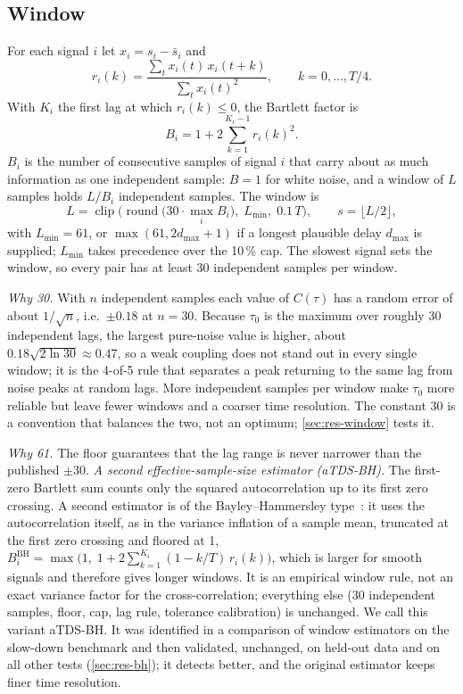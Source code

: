 \documentclass[11pt,a4paper]{article}
\begin{document}
\subsection{Window}
\label{sec:window}
For each signal $i$ let $x_i = s_i - \bar s_i$ and
\begin{equation}
r_i(k) = \frac{\sum_t x_i(t)\, x_i(t+k)}{\sum_t x_i(t)^2}, \qquad k = 0, \dots, T/4 .
\end{equation}
With $K_i$ the first lag at which $r_i(k) \le 0$, the Bartlett factor is
\begin{equation}
B_i = 1 + 2 \sum_{k=1}^{K_i - 1} r_i(k)^2 .
\label{eq:bartlett}
\end{equation}
$B_i$ is the number of consecutive samples of signal $i$ that carry about as much information as one independent sample: $B = 1$ for white noise, and a window of $L$ samples holds $L / B_i$ independent samples. The window is
\begin{equation}
L = \operatorname{clip}\!\Big(\operatorname{round}\big(30 \cdot \max_i B_i\big),\; L_{\min},\; 0.1\,T\Big), \qquad s = \lfloor L/2 \rfloor ,
\label{eq:window}
\end{equation}
with $L_{\min} = 61$, or $\max(61, 2 d_{\max} + 1)$ if a longest plausible delay $d_{\max}$ is supplied; $L_{\min}$ takes precedence over the 10\,\% cap. The slowest signal sets the window, so every pair has at least 30 independent samples per window.

\emph{Why 30.} With $n$ independent samples each value of $C(\tau)$ has a random error of about $1/\sqrt{n}$, i.e.\ $\pm0.18$ at $n = 30$. Because $\tau_0$ is the maximum over roughly 30 independent lags, the largest pure-noise value is higher, about $0.18\sqrt{2\ln 30} \approx 0.47$, so a weak coupling does not stand out in every single window; it is the 4-of-5 rule that separates a peak returning to the same lag from noise peaks at random lags. More independent samples per window make $\tau_0$ more reliable but leave fewer windows and a coarser time resolution. The constant 30 is a convention that balances the two, not an optimum; \cref{sec:res-window} tests it.

\emph{Why 61.} The floor guarantees that the lag range is never narrower than the published $\pm30$.
\emph{A second effective-sample-size estimator (aTDS-BH).} The first-zero Bartlett sum counts only the squared autocorrelation up to its first zero crossing. A second estimator is of the Bayley--Hammersley type~\cite{Bayley1946EffectiveNumber}: it uses the autocorrelation itself, as in the variance inflation of a sample mean, truncated at the first zero crossing and floored at 1, $B^{\mathrm{BH}}_i = \max\!\big(1,\; 1 + 2\sum_{k=1}^{K_i} (1 - k/T)\, r_i(k)\big)$, which is larger for smooth signals and therefore gives longer windows. It is an empirical window rule, not an exact variance factor for the cross-correlation; everything else (30 independent samples, floor, cap, lag rule, tolerance calibration) is unchanged. We call this variant aTDS-BH. It was identified in a comparison of window estimators on the slow-down benchmark and then validated, unchanged, on held-out data and on all other tests (\cref{sec:res-bh}); it detects better, and the original estimator keeps finer time resolution.
\end{document}
